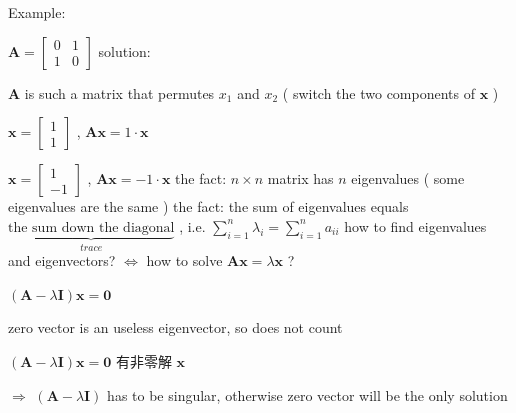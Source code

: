 \documentclass[12pt, a4paper]{article}
\begin{document}
{Example:
\par 
\begin{math}
	{\mathbf{A}} = 
	\begin{bmatrix}
		0 & 1 \\
		1 & 0 
	\end{bmatrix}
\end{math}
\newline
solution:
\par ${\mathbf{A}}$ is such a matrix that permutes $x_1$ and $x_2$ ( switch the two components of ${\mathbf{x}}$ )
\par {} 
\begin{math}
	{\mathbf{x}} = 
	\begin{bmatrix}
		1 \\
		1 
	\end{bmatrix}
\end{math}
 , 
${\mathbf{A}}{\mathbf{x}} = 1 \cdot {\mathbf{x}}$
\par {} 
\begin{math}
	{\mathbf{x}} = 
	\begin{bmatrix}
		1 \\
		-1 
	\end{bmatrix}
\end{math}
, 
${\mathbf{A}}{\mathbf{x}} = -1 \cdot {\mathbf{x}}$
\vspace{14pt}
\newline
{\textcolor{anhao-scarlet}{the fact: $n \times n$ matrix has $n$ eigenvalues ( some eigenvalues are the same )}}
\vspace{14pt}
\newline
{
	\textcolor{anhao-scarlet}
	{
		the fact: the sum of eigenvalues equals $\underbrace{\text{the sum down the diagonal}}_{trace}$ , i.e. $\sum\limits_{i=1}^{n}\lambda_i = \sum\limits_{i=1}^{n}a_{ii}$
	}
}
\vspace{14pt}
\newline
how to find eigenvalues and eigenvectors? $\Longleftrightarrow$ how to solve ${\mathbf{A}}{\mathbf{x}} = \lambda{\mathbf{x}}$ ?
\par $\left( {\mathbf{A}} - \lambda{\mathbf{I}} \right){\mathbf{x}} = {\mathbf{0}}$
\par zero vector is an useless eigenvector, so does not count
\par $\left( {\mathbf{A}} - \lambda{\mathbf{I}} \right){\mathbf{x}} = {\mathbf{0}}$ 有非零解 ${\mathbf{x}}$
\par $\Longrightarrow$ $\left( {\mathbf{A}} - \lambda{\mathbf{I}} \right)$ has to be singular, otherwise zero vector will be the only solution
}
\end{document}
